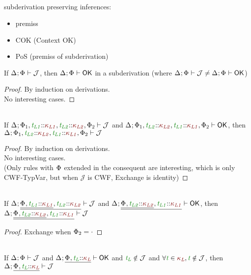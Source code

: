 \documentclass[11pt]{article}
\begin{document}
    \subsection*{}
    subderivation preserving inferences:
    \begin{itemize}
        \item premiss
        \item COK (Context OK)
        \item PoS (premiss of subderivation)
    \end{itemize}
    \begin{lemma}[COK]
        If $\J$, then $\ContextWellFormed$ in a subderivation (where $\J\neq\ContextWellFormed$)
    \end{lemma}
    \begin{proof}
        By induction on derivations. \\
        No interesting cases.
    \end{proof}
    \begin{lemma}[Exchange]
        \vphantom{.}\\
        If $\J[\HoleCtx\TypVarCtx[][1],\typvar[L1]\KndAssump\knd[L1],\typvar[L2]\KndAssump\knd[L2],\TypVarCtx[][2]]$ and $\ContextWellFormed[\HoleCtx\TypVarCtx[][1],\typvar[L2]\KndAssump\knd[L2],\typvar[L1]\KndAssump\knd[L1],\TypVarCtx[][2]]$, then $\J[\HoleCtx\TypVarCtx[][1],\typvar[L2]\KndAssump\knd[L2],\typvar[L1]\KndAssump\knd[L1],\TypVarCtx[][2]]$
    \end{lemma}
    \begin{proof}
        By induction on derivations. \\
        No interesting cases. \\
        (Only rules with $\TypVarCtx$ extended in the consequent are interesting, which is only CWF-TypVar, but when $\mathcal{J}$ is CWF, Exchange is identity)
    \end{proof}
    \begin{corollary}
        \vphantom{.}\\
        If $\J[\HoleCtx\xxExtendTypVarCtx[][L1]{\knd[L1]}[L2]{\knd[L2]}]$ and $\ContextWellFormed[\HoleCtx\xxExtendTypVarCtx[][L2]{\knd[L2]}[L1]{\knd[L1]}]$, then $\J[\HoleCtx\xxExtendTypVarCtx[][L2]{\knd[L2]}[L1]{\knd[L1]}]$
    \end{corollary}
    \begin{proof}
        Exchange when $\TypVarCtx[][2]=\cdot$
    \end{proof}
    \begin{lemma}[Weakening]
        \vphantom{.}\\
        If $\J$ and $\ContextWellFormed[\HoleCtx\xExtendTypVarCtx[][L][\knd[L]]]$ and $\typvar[L]\notin\mathcal{J}$ and $\forall\typvar\in\knd[L],\typvar\notin\mathcal{J}$, then $\J[\HoleCtx\xExtendTypVarCtx[][L][\knd[L]]]$
    \end{lemma}
\end{document}
